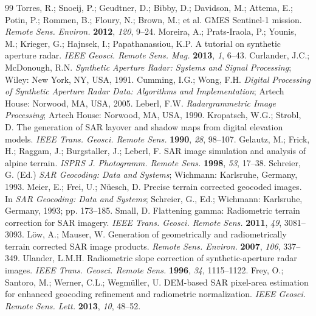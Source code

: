 \documentclass[10pt,a4paper]{article}
\begin{document}
\vspace{8pt}
{\small
\begin{thebibliography}{99}
 Torres, R.; Snoeij, P.; Geudtner, D.; Bibby, D.; Davidson, M.; Attema, E.; Potin, P.; Rommen, B.; Floury, N.; Brown, M.; et al. GMES Sentinel-1 mission. \textit{Remote Sens. Environ.} \textbf{2012}, \textit{120}, 9--24.
 Moreira, A.; Prats-Iraola, P.; Younis, M.; Krieger, G.; Hajnsek, I.; Papathanassiou, K.P. A tutorial on synthetic aperture radar. \textit{IEEE Geosci. Remote Sens. Mag.} \textbf{2013}, \textit{1}, 6--43.
 Curlander, J.C.; McDonough, R.N. \textit{Synthetic Aperture Radar: Systems and Signal Processing}; Wiley: New York, NY, USA, 1991.
 Cumming, I.G.; Wong, F.H. \textit{Digital Processing of Synthetic Aperture Radar Data: Algorithms and Implementation}; Artech House: Norwood, MA, USA, 2005.
 Leberl, F.W. \textit{Radargrammetric Image Processing}; Artech House: Norwood, MA, USA, 1990.
 Kropatsch, W.G.; Strobl, D. The generation of SAR layover and shadow maps from digital elevation models. \textit{IEEE Trans. Geosci. Remote Sens.} \textbf{1990}, \textit{28}, 98--107.
 Gelautz, M.; Frick, H.; Raggam, J.; Burgstaller, J.; Leberl, F. SAR image simulation and analysis of alpine terrain. \textit{ISPRS J. Photogramm. Remote Sens.} \textbf{1998}, \textit{53}, 17--38.
 Schreier, G. (Ed.) \textit{SAR Geocoding: Data and Systems}; Wichmann: Karlsruhe, Germany, 1993.
 Meier, E.; Frei, U.; N\"uesch, D. Precise terrain corrected geocoded images. In \textit{SAR Geocoding: Data and Systems}; Schreier, G., Ed.; Wichmann: Karlsruhe, Germany, 1993; pp. 173--185.
 Small, D. Flattening gamma: Radiometric terrain correction for SAR imagery. \textit{IEEE Trans. Geosci. Remote Sens.} \textbf{2011}, \textit{49}, 3081--3093.
 L\"ow, A.; Mauser, W. Generation of geometrically and radiometrically terrain corrected SAR image products. \textit{Remote Sens. Environ.} \textbf{2007}, \textit{106}, 337--349.
 Ulander, L.M.H. Radiometric slope correction of synthetic-aperture radar images. \textit{IEEE Trans. Geosci. Remote Sens.} \textbf{1996}, \textit{34}, 1115--1122.
 Frey, O.; Santoro, M.; Werner, C.L.; Wegm\"uller, U. DEM-based SAR pixel-area estimation for enhanced geocoding refinement and radiometric normalization. \textit{IEEE Geosci. Remote Sens. Lett.} \textbf{2013}, \textit{10}, 48--52.

\end{thebibliography}}
\end{document}
